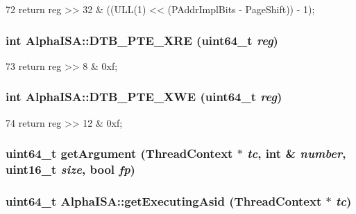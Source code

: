\begin{DoxyCode}
72 { return reg >> 32 & ((ULL(1) << (PAddrImplBits - PageShift)) - 1); }
\end{DoxyCode}
\hypertarget{namespaceAlphaISA_a76be4c8ee9a4f1e3f22b6d2b7ac4bfa8}{
\subsubsection[{DTB\_\-PTE\_\-XRE}]{\setlength{\rightskip}{0pt plus 5cm}int AlphaISA::DTB\_\-PTE\_\-XRE (uint64\_\-t {\em reg})}}
\label{namespaceAlphaISA_a76be4c8ee9a4f1e3f22b6d2b7ac4bfa8}



\begin{DoxyCode}
73 { return reg >> 8 & 0xf; }
\end{DoxyCode}
\hypertarget{namespaceAlphaISA_a310e34dbbc9219cdeb9c877e6d0bd1f7}{
\subsubsection[{DTB\_\-PTE\_\-XWE}]{\setlength{\rightskip}{0pt plus 5cm}int AlphaISA::DTB\_\-PTE\_\-XWE (uint64\_\-t {\em reg})}}
\label{namespaceAlphaISA_a310e34dbbc9219cdeb9c877e6d0bd1f7}



\begin{DoxyCode}
74 { return reg >> 12 & 0xf; }
\end{DoxyCode}
\hypertarget{namespaceAlphaISA_a3f9560369e934be05b1dd8f23fbd6104}{
\subsubsection[{getArgument}]{\setlength{\rightskip}{0pt plus 5cm}uint64\_\-t getArgument ({\bf ThreadContext} $\ast$ {\em tc}, \/  int \& {\em number}, \/  uint16\_\-t {\em size}, \/  bool {\em fp})}}
\label{namespaceAlphaISA_a3f9560369e934be05b1dd8f23fbd6104}
\hypertarget{namespaceAlphaISA_abb48fd2963e6ebf6b013e5546f1f7d87}{
\subsubsection[{getExecutingAsid}]{\setlength{\rightskip}{0pt plus 5cm}uint64\_\-t AlphaISA::getExecutingAsid ({\bf ThreadContext} $\ast$ {\em tc})}}
\label{namespaceAlphaISA_abb48fd2963e6ebf6b013e5546f1f7d87}



